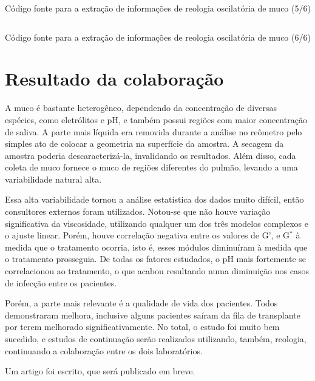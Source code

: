 		\begin{listing}[h]
			\inputminted{python}{./python/extracao_muco5.py}
			\caption{Código fonte para a extração de informações de reologia oscilatória de muco (5/6)}
			\label{lst:extracao_muco5}
		\end{listing}
		
		\begin{listing}[h]
			\inputminted{python}{./python/extracao_muco6.py}
			\caption{Código fonte para a extração de informações de reologia oscilatória de muco (6/6)} 
			\label{lst:extracao_muco6}
		\end{listing}
		
		\FloatBarrier
		
		\chapter{Resultado da colaboração} 
		
		A muco é bastante heterogêneo, dependendo da concentração de diversas espécies, como eletrólitos e pH, e também possui regiões com maior concentração de saliva. A parte mais líquida era removida durante a análise no reômetro pelo simples ato de colocar a geometria na superfície da amostra. A secagem da amostra poderia descaracterizá-la, invalidando os resultados. Além disso, cada coleta de muco fornece o muco de regiões diferentes do pulmão, levando a uma variabilidade natural alta.
		
		Essa alta variabilidade tornou a análise estatística dos dados muito difícil, então consultores externos foram utilizados. Notou-se que não houve variação significativa da viscosidade, utilizando qualquer um dos três modelos complexos e o ajuste linear.  Porém, houve correlação negativa entre os valores de G', e G\(^*\) à medida que o tratamento ocorria, isto é, esses módulos diminuíram à medida que o tratamento prosseguia. De todas os fatores estudados, o pH mais fortemente se correlacionou ao tratamento, o que acabou resultando numa diminuição nos casos de infecção entre os pacientes.
		
		Porém, a parte mais relevante é a qualidade de vida dos pacientes. Todos demonstraram melhora, inclusive alguns pacientes saíram da fila de transplante por terem melhorado significativamente. No total, o estudo foi muito bem sucedido, e estudos de continuação serão realizados utilizando, também, reologia, continuando a colaboração entre os dois laboratórios.
		
		Um artigo foi escrito, que será publicado em breve. %
		
